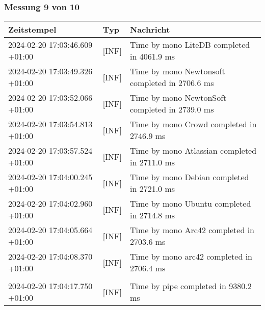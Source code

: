     \subsubsection{Messung 9 von 10} \label{subsubsec:LiteDbWenigerPaketeAlsDb9von10}
        {
            {\small
                \begin{tabularx}{\textwidth}{|l|l|X|}
                    \hline
                    \textbf{Zeitstempel} & \textbf{Typ} & \textbf{Nachricht} \\
                    \hline
                    \endhead
                    2024-02-20 17:03:46.609 +01:00 & [INF] & Time by mono LiteDB completed in 4061.9 ms \\
                    2024-02-20 17:03:49.326 +01:00 & [INF] & Time by mono Newtonsoft completed in 2706.6 ms \\
                    2024-02-20 17:03:52.066 +01:00 & [INF] & Time by mono NewtonSoft completed in 2739.0 ms \\
                    2024-02-20 17:03:54.813 +01:00 & [INF] & Time by mono Crowd completed in 2746.9 ms \\
                    2024-02-20 17:03:57.524 +01:00 & [INF] & Time by mono Atlassian completed in 2711.0 ms \\
                    2024-02-20 17:04:00.245 +01:00 & [INF] & Time by mono Debian completed in 2721.0 ms \\
                    2024-02-20 17:04:02.960 +01:00 & [INF] & Time by mono Ubuntu completed in 2714.8 ms \\
                    2024-02-20 17:04:05.664 +01:00 & [INF] & Time by mono Arc42 completed in 2703.6 ms \\
                    2024-02-20 17:04:08.370 +01:00 & [INF] & Time by mono arc42 completed in 2706.4 ms \\
                    & & \\
                    2024-02-20 17:04:17.750 +01:00 & [INF] & Time by pipe completed in 9380.2 ms \\
                    \hline
                \end{tabularx}
            }
        }

